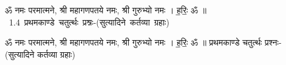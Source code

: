 \documentclass[17pt]{extarticle}
\begin{document}
\begin{titlepage}
    \begin{center}
 
\begin{sanskrit}
    { \Large
    ॐ नमः परमात्मने, श्री महागणपतये नमः, 
श्री गुरुभ्यो नमः । ह॒रिः॒ ॐ ॥ 
    }
    \\
    \vspace{2.5cm}
    \mbox{ \Huge
    1.4     प्रथमकाण्डे चतुर्त्थः प्रश्नः-(सुत्यादिने कर्तव्या ग्रहाः)   }
\end{sanskrit}
\end{center}

\end{titlepage}
\tableofcontents

ॐ नमः परमात्मने, श्री महागणपतये नमः, 
श्री गुरुभ्यो नमः । ह॒रिः॒ ॐ ॥      प्रथमकाण्डे चतुर्त्थः प्रश्नः-(सुत्यादिने कर्तव्या ग्रहाः) \newline

\end{document}
